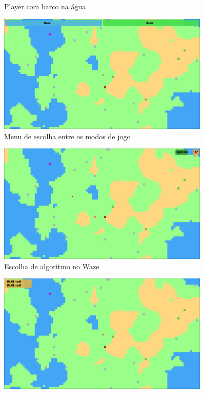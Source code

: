 \documentclass[
	12pt,				%
	oneside,			%
	a4paper,			%
	english,			%
	brazil,				%
	]{abntex2}
\begin{document}
{\begin{figure}[H]
\caption{Player com barco na água}
\label{imagem 5}
\end{figure}
\begin{figure}[H]
\centering
\includegraphics[width=0.9\textwidth]{imgs/escolha.png}
\caption{Menu de escolha entre os modos de jogo}
\label{imagem 5}
\end{figure}
\begin{figure}[H]
\centering
\includegraphics[width=0.9\textwidth]{imgs/waze-escolha.png}
\caption{Escolha de algoritmo no Waze}
\label{imagem 5}
\end{figure}
\begin{figure}[H]
\centering
\includegraphics[width=0.9\textwidth]{imgs/waze-1.png}

\end{figure}}
\end{document}
